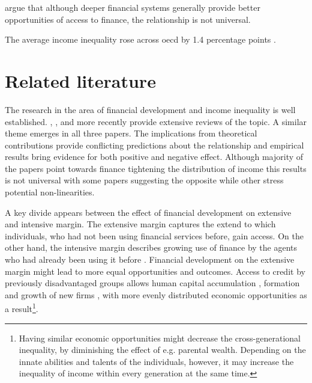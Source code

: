 \documentclass[a4paper,11pt]{article}
\begin{document}
\citet{claessens2007finance} argue that although deeper financial systems generally provide better opportunities of access to finance, the relationship is not universal.

The average income inequality rose across \ac{oecd} by 1.4 percentage points \citep{oecd2013crisis}.

\section{Related literature}
The research in the area of financial development and income inequality is well established. \citet{demirgucc2009finance}, \citet{claessens2007finance}, and more recently \cite{de2017finance} provide extensive reviews of the topic. A similar theme emerges in all three papers. The implications from theoretical contributions provide conflicting predictions about the relationship and empirical results bring evidence for both positive and negative effect. Although majority of the papers point towards finance tightening the distribution of income this results is not universal with some papers suggesting the opposite while other stress potential non-linearities.

A key divide appears between the effect of financial development on extensive and intensive margin. The extensive margin captures the extend to which individuals, who had not been using financial services before, gain access. On the other hand, the intensive margin describes growing use of finance by the agents who had already been using it before \citep{demirgucc2009finance}. Financial development on the extensive margin might lead to more equal opportunities and outcomes. Access to credit by previously disadvantaged groups allows human capital accumulation \citep{galorzeira1993income, galormoav2004, braunetal2019}, formation and growth of new firms \citep{evans1989estimated,banerjeenewman1990}, with more evenly distributed economic opportunities as a result\footnote{Having similar economic opportunities might decrease the cross-generational inequality, by diminishing the effect of e.g. parental wealth. Depending on the innate abilities and talents of the individuals, however, it may increase the inequality of income within every generation at the same time.}.
\end{document}
